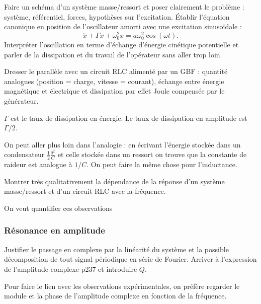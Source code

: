 Faire un schéma d'un système masse/ressort et poser clairement le problème : système, référentiel, forces, hypothèses sur l'excitation.
Établir l'équation canonique en position de l'oscillateur amorti avec une excitation sinusoïdale :
\begin{equation}
\ddot{x} + \Gamma \dot{x} + \omega_0^2 x = a \omega_0^2 \cos(\omega t).
\label{eq:lp24_osc}
\end{equation}
Interpréter l'oscillation en terme d'échange d'énergie cinétique potentielle et parler de la dissipation et du travail de l'opérateur sans aller trop loin.

Dresser le parallèle avec un circuit RLC alimenté par un GBF : quantité analogues (position = charge, vitesse = courant), échange entre énergie magnétique et électrique et dissipation par effet Joule compensée par le générateur.

\begin{remarque}
$\Gamma$ est le taux de dissipation en énergie.
Le taux de dissipation en amplitude est $\Gamma/2$.

\noindent
On peut aller plus loin dans l'analogie : en écrivant l'énergie stockée dans un condensateur $\frac{1}{2}\frac{q^2}{C}$ et celle stockée dans un ressort on trouve que la constante de raideur est analogue à $1/C$.
On peut faire la même chose pour l'inductance.
\end{remarque}


\begin{experience}
Montrer très qualitativement la dépendance de la réponse d'un système masse/ressort et d'un circuit RLC avec la fréquence. 
\end{experience}

\begin{transition}
On veut quantifier ces observations
\end{transition}

\subsubsection{Résonance en amplitude}

Justifier le passage en complexe par la linéarité du système et la possible décomposition de tout signal périodique en série de Fourier.
Arriver à l'expression de l'amplitude complexe \cite{Michel2017} p237 et introduire $Q$.

Pour faire le lien avec les observations expérimentales, on préfère regarder le module et la phase de l'amplitude complexe en fonction de la fréquence.

